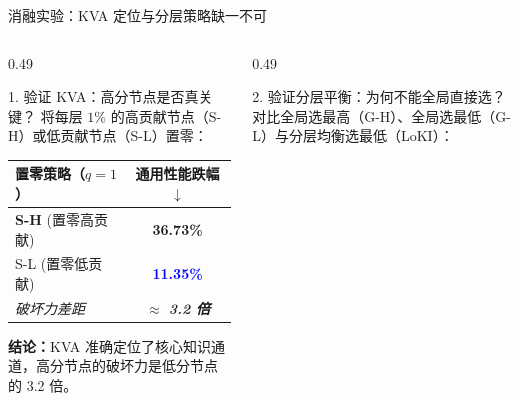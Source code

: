 \documentclass{beamer}
\begin{document}
    \begin{frame}{消融实验：KVA 定位与分层策略缺一不可}
        \begin{columns}[T]
            \begin{column}{0.49\textwidth}
                \begin{block}{1. 验证 KVA：高分节点是否真关键？}
                    将每层 $1\%$ 的高贡献节点（S-H）或低贡献节点（S-L）置零：
                    \vspace{0.2cm}
                    
                    \centering
                    \small
                    \begin{tabular}{l|c}
                        \toprule
                        \textbf{置零策略（$q=1$）} & \textbf{通用性能跌幅 $\downarrow$} \\
                        \midrule
                        \textbf{S-H} (置零高贡献) & \alert{\textbf{36.73\%}} \\
                        S-L (置零低贡献) & \textcolor{blue}{\textbf{11.35\%}} \\
                        \midrule
                        \textit{破坏力差距} & \textit{$\approx$ \textbf{3.2 倍}} \\
                        \bottomrule
                    \end{tabular}
                \end{block}
                \vspace{0.1cm}
                \footnotesize \textbf{结论：}KVA 准确定位了核心知识通道，高分节点的破坏力是低分节点的 3.2 倍。
            \end{column}

            \begin{column}{0.49\textwidth}
                \begin{block}{2. 验证分层平衡：为何不能全局直接选？}
                    对比全局选最高（G-H）、全局选最低（G-L）与分层均衡选最低（LoKI）：
                    \vspace{0.2cm}
                    

\end{block}
\end{column}
\end{columns}
\end{frame}
\end{document}
